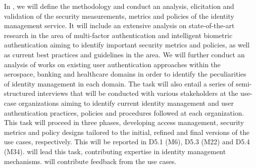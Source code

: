 \begin{Workpackage}{\thewpno}
\begin{WPDescription}
\end{WPDescription}

\begin{Task}

\TaskResults{%
\ref{del:auth1},
\ref{del:auth3},
\ref{del:auth4}
}
\TaskHeader{}

In \theTask, we will define the methodology and conduct an analysis, elicitation and validation of the security measurements, metrics and policies of the identity management service. It will include an extensive analysis on state-of-the-art research in the area of multi-factor authentication and intelligent biometric authentication aiming to identify important security metrics and policies, as well as current best practices and guidelines in the area. We will further conduct an analysis of works on existing user authentication approaches within the aerospace, banking and healthcare domains in order to identify the peculiarities of identity management in each domain. The task will also entail a series of semi-structured interviews that will be conducted with various stakeholders at the use-case organizations aiming to identify current identity management and user authentication practices, policies and procedures followed at each organization. This task will proceed in three phases, developing access management, security metrics and policy designs tailored to the initial, refined and final versions of the use cases, respectively. This
will be reported in D5.1 (M6), D5.3 (M22) and D5.4 (M34). \COGNIshort{} will lead this task, contributing expertise in identity management mechanisms. \SOPRAshort{} will contribute feedback from the use cases. 
\end{Task}

\begin{Task}

\TaskResults{%
\ref{del:auth2},
\ref{del:auth3},
\ref{del:auth4}
}
\TaskHeader{}


\end{Task}
\end{Workpackage}
